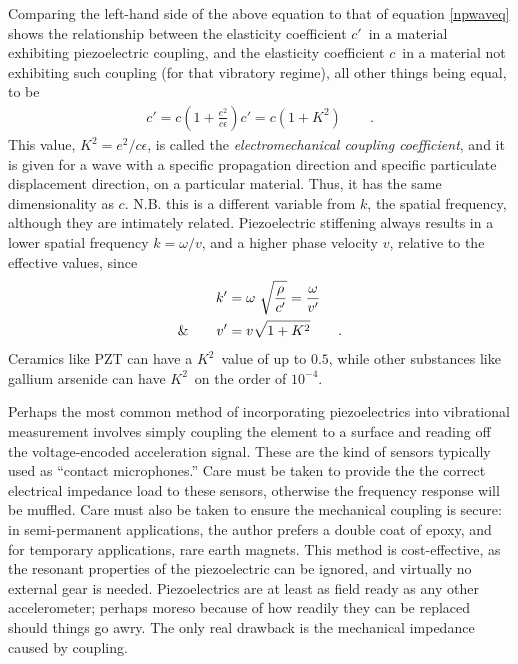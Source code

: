 \documentclass[a4paper,10pt]{report}
\numberwithin{equation}{section}
\begin{document}
{\begin{section}
\begin{equation*}
\end{equation*}
Comparing the left-hand side of the above equation to that of equation \eqref{npwaveq} shows the relationship between the elasticity coefficient $c'$\  in a material exhibiting piezoelectric coupling, and the elasticity coefficient $c$\  in a material not exhibiting such coupling (for that vibratory regime), all other things being equal, to be
\begin{align*}
c' = c\left( 1 + \frac{e^2}{c \epsilon}\right)
c' = c (1 + K^2) \qquad \text{.}
\end{align*}
This value, $K^2 = e^2/c \epsilon$, is called the \emph{electromechanical coupling coefficient}, and it is given for a wave with a specific propagation direction and specific particulate displacement direction, on a particular material. Thus, it has the same dimensionality as $c$. \cite[p.~28]{Ballantine1997} N.B. this is a different variable from $k$, the spatial frequency, although they are intimately related. Piezoelectric stiffening always results in a lower spatial frequency $k = \omega / v$, and a higher phase velocity $v$, relative to the effective values, since 
\begin{align}
 k' &= \omega \ \sqrt{\frac{\rho}{c'}} = \frac{\omega}{v'} \notag\\
 \text{\&} \qquad v' &= v \sqrt{1 + K^2} \qquad \text{.}
\end{align}
Ceramics like PZT can have a $K^2$\  value of up to $0.5$, while other substances like gallium arsenide can have $K^2$\  on the order of $10^{-4}$. \cite[p.~22]{Kino1987}
\par
Perhaps the most common method of incorporating piezoelectrics into vibrational measurement involves simply coupling the element to a surface and reading off the voltage-encoded acceleration signal. These are the kind of sensors typically used as ``contact microphones.'' Care must be taken to provide the the correct electrical impedance load to these sensors, otherwise the frequency response will be muffled. Care must also be taken to ensure the mechanical coupling is secure: in semi-permanent applications, the author prefers a double coat of epoxy, and for temporary applications, rare earth magnets. This method is cost-effective, as the resonant properties of the piezoelectric can be ignored, and virtually no external gear is needed. Piezoelectrics are at least as field ready as any other accelerometer; perhaps moreso because of how readily they can be replaced should things go awry. The only real drawback is the mechanical impedance caused by coupling. 

\end{section}}
\end{document}
